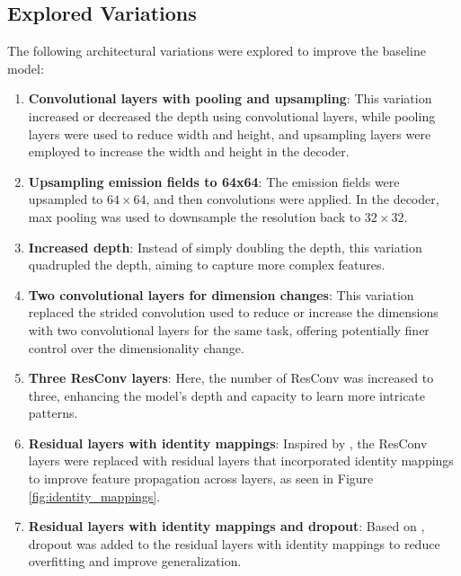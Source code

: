 \subsection{Explored Variations}
The following architectural variations were explored to improve the baseline model: 
\begin{enumerate}
    \item \textbf{Convolutional layers with pooling and upsampling}: This variation increased or decreased the depth using convolutional layers, while pooling layers were used to reduce width and height, and upsampling layers were employed to increase the width and height in the decoder.
    \item \textbf{Upsampling emission fields to 64x64}: The emission fields were upsampled to $64 \times 64$, and then convolutions were applied. In the decoder, max pooling was used to downsample the resolution back to $32 \times 32$.
    \item \textbf{Increased depth}: Instead of simply doubling the depth, this variation quadrupled the depth, aiming to capture more complex features.
    \item \textbf{Two convolutional layers for dimension changes}: This variation replaced the strided convolution used to reduce or increase the dimensions with two convolutional layers for the same task, offering potentially finer control over the dimensionality change. 
    \item \textbf{Three \gls{ResConv} layers}: Here, the number of \gls{ResConv} was increased to three, enhancing the model’s depth and capacity to learn more intricate patterns.
    \item \textbf{Residual layers with identity mappings}: Inspired by \parencite{IdentityMappings}, the \gls{ResConv} layers were replaced with residual layers that incorporated identity mappings to improve feature propagation across layers, as seen in Figure \ref{fig:identity_mappings}.
    \item \textbf{Residual layers with identity mappings and dropout}: Based on \parencite{WideResNet}, dropout was added to the residual layers with identity mappings to reduce overfitting and improve generalization.
\end{enumerate}

